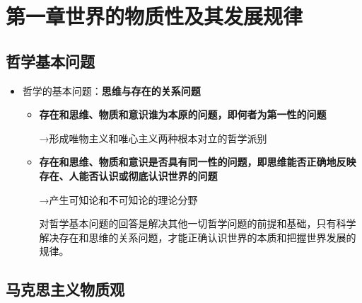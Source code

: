 \documentclass[12pt,openany]{ctexbook}
\begin{document}
\chapter{第一章\quad{}世界的物质性及其发展规律}
\section{哲学基本问题}
\begin{itemize}
  \item 哲学的基本问题：\textbf{思维与存在的关系问题}
\begin{itemize}
  \item \textbf{存在和思维、物质和意识谁为本原的问题，即何者为第一性的问题}
  \par →形成唯物主义和唯心主义两种根本对立的哲学派别
  \item \textbf{存在和思维、物质和意识是否具有同一性的问题，即思维能否正确地反映存在、人能否认识或彻底认识世界的问题}
  \par →产生可知论和不可知论的理论分野
  \par 对哲学基本问题的回答是解决其他一切哲学问题的前提和基础，只有科学解决存在和思维的关系问题，才能正确认识世界的本质和把握世界发展的规律。
\end{itemize}
\end{itemize}
\section{马克思主义物质观}
\end{document}
